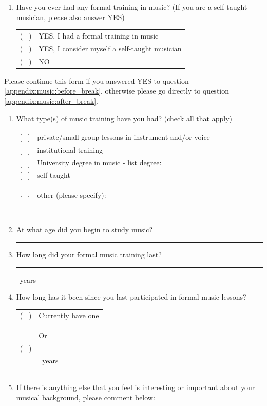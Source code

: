 \documentclass[a4paper,11pt]{article}
\newcommand{\myunderline}{\rule{2in}{.5pt}}
\begin{document}
{\begin{appendices}
\begin{enumerate}[resume]
	\item \label{appendix:music:before_break}Have you ever had any formal training in music? (If you are a self-taught musician, please also answer YES)

	\begin{tabular}{l l}
		( \ ) & YES, I had a formal training in music \\
		( \ ) & YES, I consider myself a self-taught musician \\
		( \ ) & NO \\
	\end{tabular}

\end{enumerate}
Please continue this form if you answered YES to question \ref{appendix:music:before_break}, otherwise please go directly to question \ref{appendix:music:after_break}.
\begin{enumerate}[resume]

	\item What type(s) of music training have you had? (check all that apply)

	\begin{tabular}{l l}
		{[{ \ }]} & private/small group lessons in instrument and/or voice \\
		{[{ \ }]} & institutional training \\
		{[{ \ }]} & University degree in music - list degree: \\
		{[{ \ }]} & self-taught \\
		{[{ \ }]} & other (please specify): \myunderline \\
	\end{tabular}

 	\item At what age did you begin to study music?

 	\myunderline

 	\item How long did your formal music training last?

 	\myunderline \ years
 	\item How long has it been since you last participated in formal music lessons?

	\begin{tabular}{l l}
		( \ ) & Currently have one \\
		( \ ) & Or \myunderline \ years \\
	\end{tabular}

	\item \label{appendix:music:after_break}If there is anything else that you feel is interesting or important about your musical background, please comment below:


\end{enumerate}
\end{appendices}}
\end{document}
